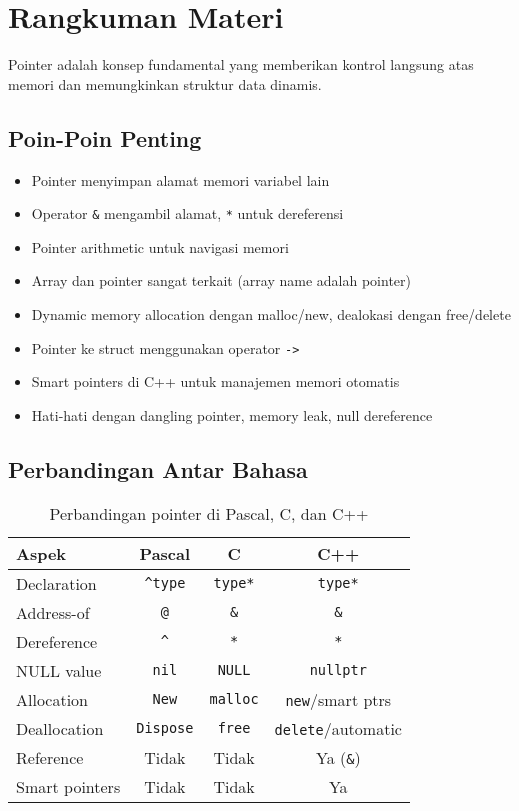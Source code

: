 \documentclass[../main.tex]{subfiles}
\begin{document}
\section{Rangkuman Materi}

Pointer adalah konsep fundamental yang memberikan kontrol langsung atas memori dan memungkinkan struktur data dinamis.

\subsection{Poin-Poin Penting}

\begin{itemize}
  \item Pointer menyimpan alamat memori variabel lain
  \item Operator \texttt{\&} mengambil alamat, \texttt{*} untuk dereferensi
  \item Pointer arithmetic untuk navigasi memori
  \item Array dan pointer sangat terkait (array name adalah pointer)
  \item Dynamic memory allocation dengan malloc/new, dealokasi dengan free/delete
  \item Pointer ke struct menggunakan operator \texttt{->}
  \item Smart pointers di C++ untuk manajemen memori otomatis
  \item Hati-hati dengan dangling pointer, memory leak, null dereference
\end{itemize}

\subsection{Perbandingan Antar Bahasa}

\begin{table}[H]
\centering
\begin{tabular}{|l|c|c|c|}
\hline
\textbf{Aspek} & \textbf{Pascal} & \textbf{C} & \textbf{C++} \\
\hline
Declaration & \texttt{\^{}type} & \texttt{type*} & \texttt{type*} \\
\hline
Address-of & \texttt{@} & \texttt{\&} & \texttt{\&} \\
\hline
Dereference & \texttt{\^{}} & \texttt{*} & \texttt{*} \\
\hline
NULL value & \texttt{nil} & \texttt{NULL} & \texttt{nullptr} \\
\hline
Allocation & \texttt{New} & \texttt{malloc} & \texttt{new}/smart ptrs \\
\hline
Deallocation & \texttt{Dispose} & \texttt{free} & \texttt{delete}/automatic \\
\hline
Reference & Tidak & Tidak & Ya (\texttt{\&}) \\
\hline
Smart pointers & Tidak & Tidak & Ya \\
\hline
\end{tabular}
\caption{Perbandingan pointer di Pascal, C, dan C++}
\end{table}
\end{document}
